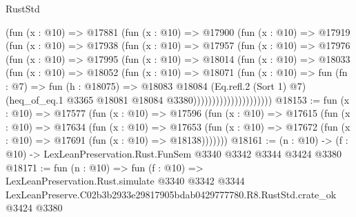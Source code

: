 \begin{lexlean}{RustStd}
\begin{coremodule}
                    (fun (x : @10) =>
                    @17881
                      (fun (x : @10) =>
                      @17900
                        (fun (x : @10) =>
                        @17919
                          (fun (x : @10) =>
                          @17938
                            (fun (x : @10) =>
                            @17957
                              (fun (x : @10) =>
                              @17976
                                (fun (x : @10) =>
                                @17995
                                  (fun (x : @10) =>
                                  @18014
                                    (fun (x : @10) =>
                                    @18033
                                      (fun (x : @10) =>
                                      @18052
                                        (fun (x : @10) =>
                                        @18071
                                          (fun (x : @10) =>
                                          fun (fn : @7) =>
                                          fun (h : @18075) =>
                                          @18083
                                            @18084
                                            (Eq.refl.{2} (Sort 1) @7)
                                            (heq_of_eq.{1}
                                              @3365
                                              @18081
                                              @18084
                                              @3380)))))))))))))))))))))
@18153 := fun (x : @10) =>
  @17577
    (fun (x : @10) =>
    @17596
      (fun (x : @10) =>
      @17615
        (fun (x : @10) =>
        @17634
          (fun (x : @10) =>
          @17653 (fun (x : @10) => @17672 (fun (x : @10) => @17691 (fun (x : @10) => @18138)))))))
@18161 := (n : @10) -> (f : @10) -> LexLeanPreservation.Rust.FunSem @3340 @3342 @3344 @3424 @3380
@18171 := fun (n : @10) =>
  fun (f : @10) =>
  LexLeanPreservation.Rust.simulate
    @3340
    @3342
    @3344
    LexLeanPreserve.C02b3b2933e29817905bdab0429777780.R8.RustStd.crate_ok
    @3424
    @3380
\end{coremodule}
\end{lexlean}
